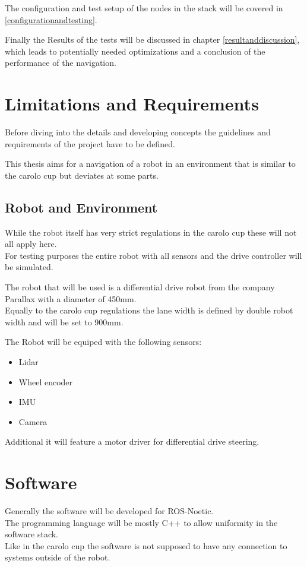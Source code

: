The configuration and test setup of the nodes in the stack will be covered in \ref{configurationandtesting}.


Finally the Results of the tests will be discussed in chapter \ref{resultanddiscussion}, which leads to potentially needed optimizations and a conclusion of the performance of the navigation.

\section{Limitations and Requirements}

Before diving into the details and developing concepts the guidelines and requirements of the project have to be defined.

This thesis aims for a navigation of a robot in an environment that is similar to the carolo cup but deviates at some parts.

\subsection{Robot and Environment}
While the robot itself has very strict regulations in the carolo cup these will not all apply here.\\

For testing purposes the entire robot with all sensors and the drive controller will be simulated.

The robot that will be used is a differential drive robot from the company Parallax with a diameter of 450mm.\\

Equally to the carolo cup regulations the lane width is defined by double robot width and will be set to 900mm. 

The Robot will be equiped with the following sensors:

\begin{itemize}
	\item Lidar
	\item Wheel encoder
	\item IMU
	\item Camera
\end{itemize}

Additional it will feature a motor driver for differential drive steering.

\section{Software}
Generally the software will be developed for ROS-Noetic.\\
The programming language will be mostly C++ to allow uniformity in the software stack.\\
Like in the carolo cup the software is not supposed to have any connection to systems outside of the robot.\\


